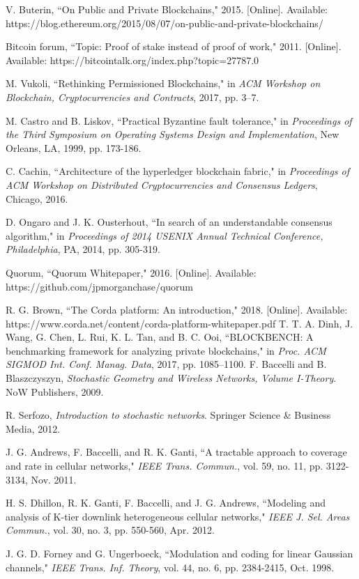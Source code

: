 \documentclass[journal]{IEEEtran}
\begin{document}
\begin{thebibliography}{1}
{	 V. Buterin, ``On Public and Private Blockchains," 2015. [Online]. Available: https://blog.ethereum.org/2015/08/07/on-public-and-private-blockchains/
	
	
	 Bitcoin forum, ``Topic: Proof of stake instead of proof of work," 2011. [Online]. Available: https://bitcointalk.org/index.php?topic=27787.0
	
	 M. Vukoli, ``Rethinking Permissioned Blockchains," in \emph{ACM
	Workshop on Blockchain, Cryptocurrencies and Contracts}, 2017, pp. 3–7.
	
	 M. Castro and B. Liskov, ``Practical Byzantine fault tolerance," in \emph{Proceedings of the Third Symposium on
		Operating Systems Design and Implementation}, New Orleans, LA, 1999, pp. 173-186.
	
	 C. Cachin, ``Architecture of the hyperledger blockchain fabric," in \emph{Proceedings of ACM Workshop on Distributed Cryptocurrencies and Consensus Ledgers}, Chicago, 2016.
	
	D. Ongaro and J. K. Ousterhout, ``In search of an understandable consensus algorithm," in \emph{Proceedings of
		2014 USENIX Annual Technical Conference, Philadelphia}, PA, 2014, pp. 305-319.
	
	 Quorum, ``Quorum Whitepaper," 2016. [Online]. Available: https://github.com/jpmorganchase/quorum
	
	  R. G. Brown, ``The Corda platform: An introduction," 2018. [Online]. Available: https://www.corda.net/content/corda-platform-whitepaper.pdf
	  T. T. A. Dinh, J. Wang, G. Chen, L. Rui, K. L. Tan, and B. C. Ooi,
	``BLOCKBENCH: A benchmarking framework for analyzing private blockchains," in \emph{Proc. ACM SIGMOD Int. Conf. Manag. Data}, 2017, pp. 1085–1100.
	 F. Baccelli and B. Blaszczyszyn, \emph{Stochastic Geometry and Wireless Networks, Volume I-Theory}. {NoW Publishers}, 2009.
	
	 R. Serfozo, \emph{Introduction to stochastic networks}. Springer Science \& Business Media, 2012.
	
	 J. G. Andrews, F. Baccelli, and R. K. Ganti, ``A tractable approach to coverage and rate in cellular networks," \emph{IEEE Trans. Commun.},  vol. 59, no. 11, pp. 3122-3134, Nov. 2011.
	
 H. S. Dhillon, R. K. Ganti, F. Baccelli, and J. G. Andrews, ``Modeling and analysis of K-tier downlink heterogeneous cellular networks," \emph{IEEE J. Sel. Areas Commun.},  vol. 30, no. 3, pp. 550-560, Apr. 2012.
}
 J. G. D. Forney and G. Ungerboeck, ``Modulation and coding for linear Gaussian channels," \emph{IEEE Trans. Inf. Theory}, vol. 44, no. 6, pp. 2384-2415, Oct. 1998.


\end{thebibliography}
\end{document}
